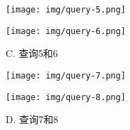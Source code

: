 \documentclass[UTF8]{ctexart}
\begin{document}
\begin{figure}[!htb]
        \centering
        \begin{minipage}[c]{0.5\textwidth}
        \centering
        \texttt{[image: img/query-5.png]}
        \end{minipage}%
        \begin{minipage}[c]{0.5\textwidth}
        \centering
        \texttt{[image: img/query-6.png]}
        \end{minipage}
        \caption{C. 查询5和6}
\end{figure}

\begin{figure}[!htb]
        \centering
        \begin{minipage}[c]{0.5\textwidth}
        \centering
        \texttt{[image: img/query-7.png]}
        \end{minipage}%
        \begin{minipage}[c]{0.5\textwidth}
        \centering
        \texttt{[image: img/query-8.png]}
        \end{minipage}
        \caption{D. 查询7和8}
\end{figure}
\end{document}

